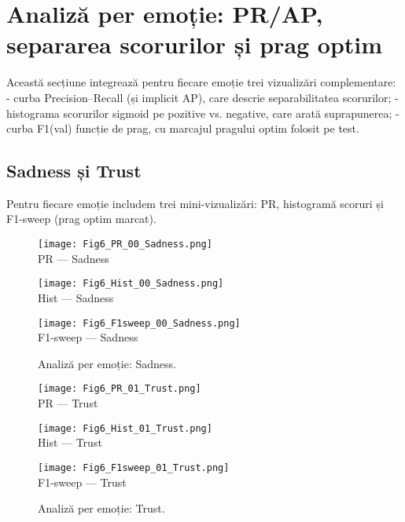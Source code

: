 \section{Analiză per emoție: PR/AP, separarea scorurilor și prag optim}
Această secțiune integrează pentru fiecare emoție trei vizualizări complementare:
- curba Precision–Recall (și implicit AP), care descrie separabilitatea scorurilor;
- histograma scorurilor sigmoid pe pozitive vs. negative, care arată suprapunerea;
- curba F1(val) funcție de prag, cu marcajul pragului optim folosit pe test.

\subsection{Sadness și Trust}
\noindent Pentru fiecare emoție includem trei mini-vizualizări: PR, histogramă scoruri și F1-sweep (prag optim marcat).
\begin{figure}[H]
  \centering
  \begin{minipage}[t]{0.32\textwidth}\centering
    \texttt{[image: Fig6\_PR\_00\_Sadness.png]}\\[-1mm]
    {\scriptsize PR — Sadness}
  \end{minipage}\hfill
  \begin{minipage}[t]{0.32\textwidth}\centering
    \texttt{[image: Fig6\_Hist\_00\_Sadness.png]}\\[-1mm]
    {\scriptsize Hist — Sadness}
  \end{minipage}\hfill
  \begin{minipage}[t]{0.32\textwidth}\centering
    \texttt{[image: Fig6\_F1sweep\_00\_Sadness.png]}\\[-1mm]
    {\scriptsize F1-sweep — Sadness}
  \end{minipage}
  \caption{Analiză per emoție: Sadness.}
  \label{fig:c6-sadness}
\end{figure}

\begin{figure}[H]
  \centering
  \begin{minipage}[t]{0.32\textwidth}\centering
    \texttt{[image: Fig6\_PR\_01\_Trust.png]}\\[-1mm]
    {\scriptsize PR — Trust}
  \end{minipage}\hfill
  \begin{minipage}[t]{0.32\textwidth}\centering
    \texttt{[image: Fig6\_Hist\_01\_Trust.png]}\\[-1mm]
    {\scriptsize Hist — Trust}
  \end{minipage}\hfill
  \begin{minipage}[t]{0.32\textwidth}\centering
    \texttt{[image: Fig6\_F1sweep\_01\_Trust.png]}\\[-1mm]
    {\scriptsize F1-sweep — Trust}
  \end{minipage}
  \caption{Analiză per emoție: Trust.}
  \label{fig:c6-trust}
\end{figure}

